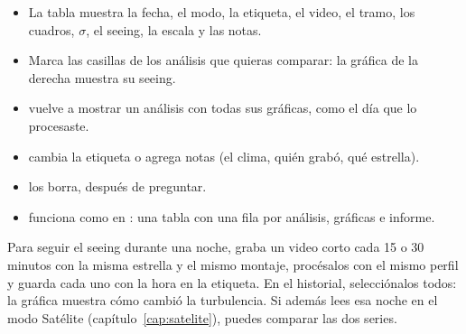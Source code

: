 
\begin{itemize}
\item La tabla muestra la fecha, el modo, la etiqueta, el video, el tramo, los cuadros, $\sigma$, el seeing, la escala y
las notas.
\item Marca las casillas de los análisis que quieras comparar: la gráfica de la derecha muestra su seeing.
\item {} vuelve a mostrar un análisis con todas sus gráficas, como el día que lo procesaste.
\item {} cambia la etiqueta o agrega notas (el clima, quién grabó, qué estrella).
\item {} los borra, después de preguntar.
\item {} funciona como en : una tabla con una fila por
análisis, gráficas e informe.
\end{itemize}

\begin{consejo}
Para seguir el seeing durante una noche, graba un video corto cada 15 o 30 minutos con la misma estrella y el mismo
montaje, procésalos con el mismo perfil y guarda cada uno con la hora en la etiqueta. En el historial, selecciónalos todos:
la gráfica muestra cómo cambió la turbulencia. Si además lees esa noche en el modo Satélite (capítulo~\ref{cap:satelite}),
puedes comparar las dos series.
\end{consejo}
